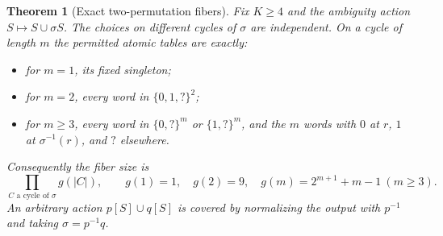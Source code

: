 \documentclass[11pt]{article}
\newtheorem{theorem}{Theorem}[section]
\begin{document}
\begin{theorem}[Exact two-permutation fibers]\label{thm:cycles}
Fix $K\geq4$ and the ambiguity action $S\mapsto S\cup\sigma S$.
The choices on different cycles of $\sigma$ are independent.
On a cycle of length $m$ the permitted atomic tables are exactly:
\begin{itemize}
\item for $m=1$, its fixed singleton;
\item for $m=2$, every word in $\{0,1,?\}^2$;
\item for $m\geq3$, every word in $\{0,?\}^m$ or $\{1,?\}^m$,
and the $m$ words with $0$ at $r$, $1$ at $\sigma^{-1}(r)$,
and $?$ elsewhere.
\end{itemize}
Consequently the fiber size is
\[
 \prod_{C\text{ a cycle of }\sigma}g(|C|),\qquad
 g(1)=1,\quad g(2)=9,\quad g(m)=2^{m+1}+m-1\ (m\geq3).
\]
An arbitrary action $p[S]\cup q[S]$ is covered by normalizing the output
with $p^{-1}$ and taking $\sigma=p^{-1}q$.
\end{theorem}
\end{document}
